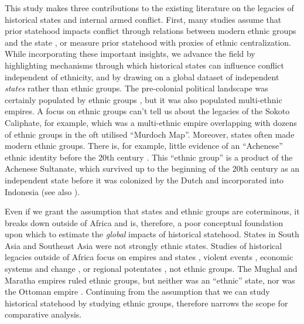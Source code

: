 This study makes three contributions to the existing literature on the legacies
of historical states and internal armed conflict. First, many studies assume
that prior statehood impacts conflict through relations between modern ethnic
groups and the state \citep{Englebert2002, Paine2019, Wig2016}, or measure prior
statehood with proxies of ethnic centralization. While incorporating these
important insights, we advance the field by highlighting mechanisms through
which historical states can influence conflict independent of ethnicity, and by
drawing on a global dataset of independent \textit{states} rather than ethnic
groups. The pre-colonial political landscape was certainly populated by ethnic
groups \citep{Murdock1967}, but it was also populated multi-ethnic empires. A
focus on ethnic groups can’t tell us about the legacies of the Sokoto Caliphate,
for example, which was a multi-ethnic empire overlapping with dozens of ethnic
groups in the oft utilised ``Murdoch Map''. Moreover, states often made modern
ethnic groups. There is, for example, little evidence of an ``Achenese'' ethnic
identity before the 20th century \citep{Aspinall2009}. This ``ethnic group'' is
a product of the Achenese Sultanate, which survived up to the beginning of the
20th century as an independent state before it was colonized by the Dutch and
incorporated into Indonesia (see also \citep{Wimmer2018}). 

Even if we grant the assumption that states and ethnic groups are coterminous,
it breaks down outside of Africa and is, therefore, a poor conceptual foundation
upon which to estimate the \textit{global} impacts of historical statehood.
States in South Asia and Southeast Asia were not strongly ethnic states. Studies
of historical legacies outside of Africa focus on empires and states
\citep{Acemoglu2011, Grosjean2011}, violent events \citep{Grosfeld2013},
economic systems and change \citep{Banerjee2005, Nunn2011}, or regional potentates \citep{Mazzuca2021}, not ethnic groups.
The Mughal and Maratha empires ruled ethnic groups, but neither was an
``ethnic'' state, nor was the Ottoman empire \citep{Richards1995, Ramusack2004,
Gordon1993}. Continuing from the assumption that we can study historical
statehood by studying ethnic groups, therefore narrows the scope for comparative
analysis.

